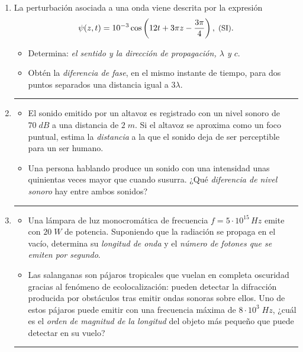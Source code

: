 \documentclass[a4paper,14pt]{exam}
\newcommand{\halmos}{\vspace*{-7mm}
	
					\begin{flushright}
						\rule{1mm}{2.5mm} 
					\end{flushright}\vspace*{-6mm}
						
					  }
\renewcommand{\qed}{\halmos}
\begin{document}
	


\begin{enumerate}
	
		\item La perturbación asociada a una onda viene descrita por la expresión
$$\psi(z,t)= 10^{-3}\cos\left(12t +3\pi z-\frac{3\pi}{4}\right),\; \text{\small (SI)}.$$
	\begin{itemize}
		\item[a)] Determina: \textit{el sentido y la dirección de propagación, $\lambda$ y $c$}.
		\item[b)] Obtén la \textit{diferencia de fase}, en el mismo instante de tiempo, para dos puntos separados una distancia igual a $3\lambda$.
	\end{itemize}
	\qed
		
		\item 
			\begin{itemize}
				\item[a)] El sonido emitido por un altavoz es registrado con un nivel sonoro de $70\;dB$ a una 
distancia de $2\;m$. Si el altavoz se aproxima como un foco puntual, estima la \textit{distancia} a la que el sonido deja de ser perceptible para un ser humano.
				\item[b)] Una persona hablando produce un sonido con una intensidad unas quinientas veces mayor que 						cuando susurra. ¿Qué \textit{diferencia de nivel sonoro} hay entre ambos sonidos?
				\vspace*{.2mm}					
			\end{itemize}
		\qed
		
		
		\item 	
			\begin{itemize}
				\item[a)] Una lámpara de luz monocromática de frecuencia $f=5\cdot 10^{15}\,Hz$ emite con $20\;W$ de potencia.  Suponiendo que la radiación se propaga en el vacío, determina su \textit{longitud de onda} y el \textit{número de fotones que se emiten por segundo}.
				\item[b)] Las salanganas %
			son pájaros tropicales que vuelan en completa oscuridad gracias al fenómeno de ecolocalización: pueden detectar la difracción producida por obstáculos tras emitir ondas sonoras sobre ellos. Uno de estos pájaros puede emitir con una frecuencia máxima de $8\cdot 10^3\; Hz$, ¿cuál es el \textit{orden de magnitud de la longitud} del objeto más pequeño que puede detectar en su vuelo?
			\end{itemize}
		\qed
		

\end{enumerate}
\end{document}
